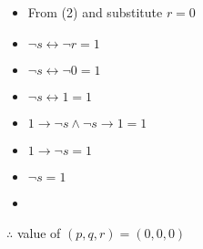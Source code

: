 \documentclass{article}
\begin{document}
\begin{enumerate}[label=\arabic*. ]
\begin{itemize}[label=$\Longrightarrow$ ]
				\item [] From (2) and substitute $r=0$
				\item $\neg s\leftrightarrow\neg r=1$
				\item $\neg s\leftrightarrow\neg0=1$
				\item $\neg s\leftrightarrow1=1$
				\item $1\to \neg s\land\neg s\to 1=1$
				\item $1\to\neg s=1$
				\item $\neg s=1$
				\item {}
			\end{itemize}
			$\therefore$ value of $(p,q,r)=(0,0,0)$
	\end{enumerate}
\end{document}
